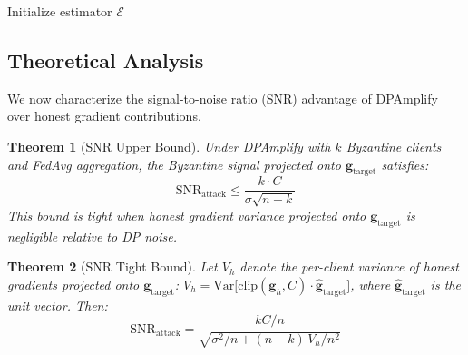 \documentclass[conference]{IEEEtran}
\newtheorem{theorem}{Theorem}
\begin{document}
\begin{algorithm}[t]
\caption{DPAmplify Byzantine Client}
\label{alg:dpamplify}
\SetAlgoLined
{}
Initialize estimator $\mathcal{E}$\;
\end{algorithm}

\subsection{Theoretical Analysis}
\label{sec:theory}

We now characterize the signal-to-noise ratio (SNR)
advantage of DPAmplify over honest gradient contributions.

\begin{theorem}[SNR Upper Bound]
\label{thm:snr-upper}
Under DPAmplify with $k$ Byzantine clients and FedAvg
aggregation, the Byzantine signal projected onto
$\mathbf{g}_{\mathrm{target}}$ satisfies:
\begin{equation}
    \mathrm{SNR}_{\mathrm{attack}}
    \leq \frac{k \cdot C}{\sigma \sqrt{n - k}}
    \label{eq:snr-upper}
\end{equation}
This bound is tight when honest gradient variance
projected onto $\mathbf{g}_{\mathrm{target}}$ is
negligible relative to DP noise.
\end{theorem}

\begin{theorem}[SNR Tight Bound]
\label{thm:snr-tight}
Let $V_h$ denote the per-client variance of honest
gradients projected onto $\mathbf{g}_{\mathrm{target}}$:
$V_h = \mathrm{Var}\bigl[\mathrm{clip}(\mathbf{g}_h, C)
\cdot \hat{\mathbf{g}}_{\mathrm{target}}\bigr]$,
where $\hat{\mathbf{g}}_{\mathrm{target}}$ is the unit
vector. Then:
\begin{equation}
    \mathrm{SNR}_{\mathrm{attack}}
    = \frac{k C / n}
    {\sqrt{\sigma^2/n
    + (n-k)\, V_h / n^2}}
    \label{eq:snr-tight}
\end{equation}
\end{theorem}
\end{document}
